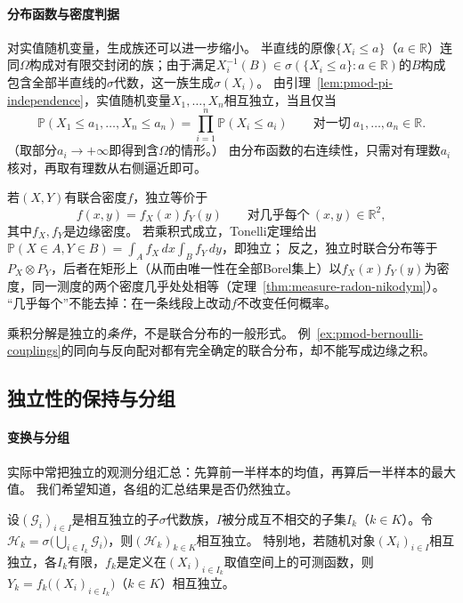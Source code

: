 \paragraph{分布函数与密度判据}
对实值随机变量，生成族还可以进一步缩小。
半直线的原像$\{X_i\le a\}$（$a\in\mathbb R$）连同$\Omega$构成对有限交封闭的族；由于满足$X_i^{-1}(B)\in\sigma(\{X_i\le a\}:a\in\mathbb R)$的$B$构成包含全部半直线的$\sigma$代数，这一族生成$\sigma(X_i)$。
由引理~\ref{lem:pmod-pi-independence}，实值随机变量$X_1,\dots,X_n$相互独立，当且仅当
\begin{equation}
  \mathbb P(X_1\le a_1,\dots,X_n\le a_n)=\prod_{i=1}^n\mathbb P(X_i\le a_i)\qquad\text{对一切}\ a_1,\dots,a_n\in\mathbb R.
  \label{eq:pmod-cdf-factorization}
\end{equation}
（取部分$a_i\to+\infty$即得到含$\Omega$的情形。）
由分布函数的右连续性，只需对有理数$a_i$核对，再取有理数从右侧逼近即可。

若$(X,Y)$有联合密度$f$，独立等价于
\[
  f(x,y)=f_X(x)f_Y(y)\qquad\text{对几乎每个}\ (x,y)\in\mathbb R^2,
\]
其中$f_X,f_Y$是边缘密度。
若乘积式成立，Tonelli定理给出$\mathbb P(X\in A,Y\in B)=\int_Af_X\,dx\int_Bf_Y\,dy$，即独立；
反之，独立时联合分布等于$P_X\otimes P_Y$，后者在矩形上（从而由唯一性在全部Borel集上）以$f_X(x)f_Y(y)$为密度，同一测度的两个密度几乎处处相等（定理~\ref{thm:measure-radon-nikodym}）。
“几乎每个”不能去掉：在一条线段上改动$f$不改变任何概率。

乘积分解是独立的\emph{条件}，不是联合分布的一般形式。
例~\ref{ex:pmod-bernoulli-couplings}的同向与反向配对都有完全确定的联合分布，却不能写成边缘之积。

\subsection{独立性的保持与分组}

\paragraph{变换与分组}
实际中常把独立的观测分组汇总：先算前一半样本的均值，再算后一半样本的最大值。
我们希望知道，各组的汇总结果是否仍然独立。

\begin{theorem}[分组与变换保持独立]
\label{thm:pmod-independence-grouping}
设$(\mathcal G_i)_{i\in I}$是相互独立的子$\sigma$代数族，$I$被分成互不相交的子集$I_k$（$k\in K$）。令
$\mathcal H_k=\sigma\bigl(\bigcup_{i\in I_k}\mathcal G_i\bigr)$，则$(\mathcal H_k)_{k\in K}$相互独立。
特别地，若随机对象$(X_i)_{i\in I}$相互独立，各$I_k$有限，$f_k$是定义在$(X_i)_{i\in I_k}$取值空间上的可测函数，则$Y_k=f_k\bigl((X_i)_{i\in I_k}\bigr)$（$k\in K$）相互独立。
\end{theorem}

